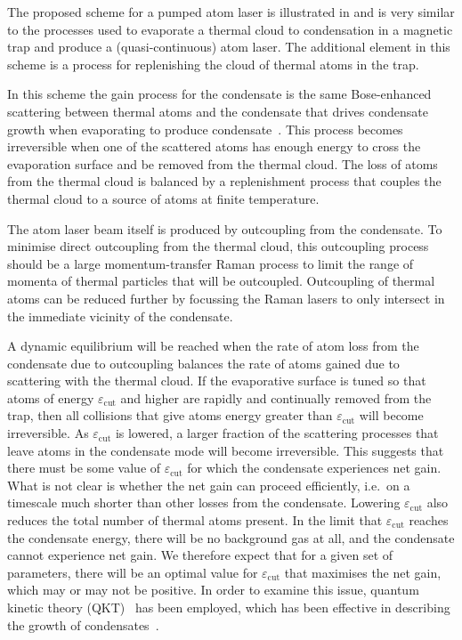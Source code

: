 The proposed scheme for a pumped atom laser is illustrated in  and is very similar to the processes used to evaporate a thermal cloud to condensation in a magnetic trap and produce a (quasi-continuous) atom laser. The additional element in this scheme is a process for replenishing the cloud of thermal atoms in the trap.  

In this scheme the gain process for the condensate is the same Bose-enhanced scattering between thermal atoms and the condensate that drives condensate growth when evaporating to produce condensate~\citep{Gardiner:1997kx,Davis:2000vn,Bijlsma:2000}.  This process becomes irreversible when one of the scattered atoms has enough energy to cross the evaporation surface and be removed from the thermal cloud.  The loss of atoms from the thermal cloud is balanced by a replenishment process that couples the thermal cloud to a source of atoms at finite temperature.

The atom laser beam itself is produced by outcoupling from the condensate.  To minimise direct outcoupling from the thermal cloud, this outcoupling process should be a large momentum-transfer Raman process to limit the range of momenta of thermal particles that will be outcoupled.  Outcoupling of thermal atoms can be reduced further by focussing the Raman lasers to only intersect in the immediate vicinity of the condensate.

A dynamic equilibrium will be reached when the rate of atom loss from the condensate due to outcoupling balances the rate of atoms gained due to scattering with the thermal cloud.  If the evaporative surface is tuned so that atoms of energy $\varepsilon_\text{cut}$ and higher are rapidly and continually removed from the trap, then all collisions that give atoms energy greater than $\varepsilon_\text{cut}$ will become irreversible. As $\varepsilon_\text{cut}$ is lowered, a larger fraction of the scattering processes that leave atoms in the condensate mode will become irreversible. This suggests that there must be some value of $\varepsilon_\text{cut}$ for which the condensate experiences net gain. What is not clear is whether the net gain can proceed efficiently, i.e.\ on a timescale much shorter than other losses from the condensate.  Lowering $\varepsilon_\text{cut}$ also reduces the total number of thermal atoms present. In the limit that $\varepsilon_\text{cut}$ reaches the condensate energy, there will be no background gas at all, and the condensate cannot experience net gain.  We therefore expect that for a given set of parameters, there will be an optimal value for $\varepsilon_\text{cut}$ that maximises the net gain, which may or may not be positive. In order to examine this issue, quantum kinetic theory (QKT)~\citep{Gardiner:1997tz,Jaksch:1997ug,Gardiner:1998wx,Jaksch:1998sj,Gardiner:2000ug,Lee:2000vs,Davis:2000vn} has been employed, which has been effective in describing the growth of condensates~\citep{Davis:2000vn}.


